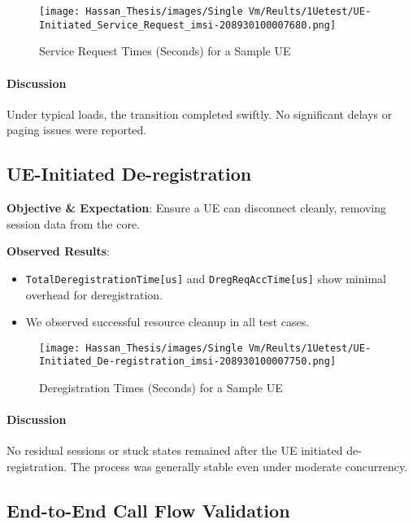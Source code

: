 \begin{figure}[H]
\centering
\caption{Service Request Times (Seconds) for a Sample UE}
\label{fig:service-req-times-sample-ue}
\texttt{[image: Hassan\_Thesis/images/Single Vm/Reults/1Uetest/UE-Initiated\_Service\_Request\_imsi-208930100007680.png]}
\end{figure}

\paragraph{Discussion}
Under typical loads, the transition completed swiftly. No significant delays or paging issues were reported.

\subsection{UE-Initiated De-registration}
\textbf{Objective \& Expectation}: Ensure a UE can disconnect cleanly, removing session data from the core.

\noindent \textbf{Observed Results}:
\begin{itemize}
    \item \texttt{TotalDeregistrationTime[us]} and \texttt{DregReqAccTime[us]} show minimal overhead for deregistration.
    \item We observed successful resource cleanup in all test cases.
\end{itemize}

\begin{figure}[H]
\centering
\caption{Deregistration Times (Seconds) for a Sample UE}
\label{fig:dereg-times-sample-ue}
\texttt{[image: Hassan\_Thesis/images/Single Vm/Reults/1Uetest/UE-Initiated\_De-registration\_imsi-208930100007750.png]}
\end{figure}

\paragraph{Discussion}
No residual sessions or stuck states remained after the UE initiated de-registration. The process was generally stable even under moderate concurrency.


\newpage
\subsection{End-to-End Call Flow Validation}
\label{subsec:end-to-end-call-flow}


